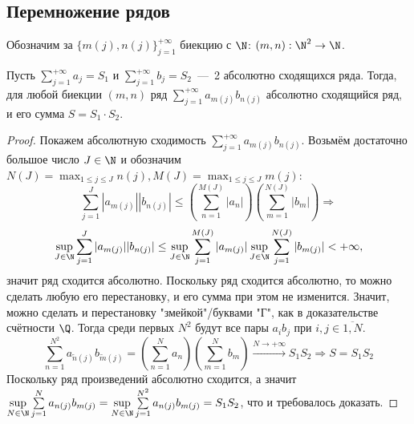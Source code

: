 \subsection{Перемножение рядов}
\begin{note}
    Обозначим за $\{m(j), n(j)\}_{j = 1}^{+\infty}$ биекцию с $\N$: $(m, n): \N^2 \rightarrow \N$.
\end{note}
\begin{theorem}
    Пусть $\sum\limits_{j = 1}^{+\infty} a_j = S_1$ и $\sum\limits_{j = 1}^{+\infty} b_j = S_2$~---~2 абсолютно сходящихся ряда. Тогда, для любой биекции $(m, n)$ ряд $\sum\limits_{j = 1}^{+\infty} a_{m(j)}b_{n(j)}$ абсолютно сходящийся ряд, и его сумма $S = S_1 \cdot S_2$.
\end{theorem}
\begin{proof}
    Покажем абсолютную сходимость $\sum\limits_{j = 1}^{+\infty} a_{m(j)}b_{n(j)}$. Возьмём достаточно большое число $J \in \N$ и обозначим $N(J) = \max_{1 \leq j \leq J} n(j), M(J) = \max_{1 \leq j \leq J} m(j)$:
    \[ \sum\limits_{j = 1}^J|a_{m(j)}||b_{n(j)}| \leq (\sum\limits_{n = 1}^{M(J)} |a_n|)(\sum\limits_{m = 1}^{N(J)} |b_m|) \Rightarrow\]
    \[ \sup\limits_{J \in \N} \sum\limits_{j = 1}^J |a_{m(j)}||b_{n(j)}| \leq \sup\limits_{J \in \N} \sum\limits_{j = 1}^{M(J)} |a_{m(j)}| \sup\limits_{J \in \N} \sum\limits_{j = 1}^{N(J)} |b_{m(j)}| < +\infty, \]
    значит ряд сходится абсолютно. Поскольку ряд сходится абсолютно, то можно сделать любую его перестановку, и его сумма при этом не изменится. Значит, можно сделать и перестановку "змейкой"/буквами "Г", как в доказательстве счётности $\Q$. Тогда среди первых $N^2$ будут все пары $a_ib_j$ при $i, j \in \overline{1, N}$.
    \[ \sum\limits_{n = 1}^{N^2} a_{\tilde{n}(j)}b_{\tilde{m}(j)} = (\sum\limits_{n = 1}^N a_n)(\sum\limits_{m = 1}^{N} b_m) \xrightarrow{N \rightarrow + \infty} S_1S_2 \Rightarrow S = S_1S_2\]
    Поскольку ряд произведений абсолютно сходится, а значит $\sup\limits_{N \in \N} \sum\limits_{j = 1}^N a_{n(j)}b_{m(j)} = \sup\limits_{N \in \N} \sum\limits_{j = 1}^{N^2} a_{n(j)}b_{m(j)} = S_1S_2$, что и требовалось доказать.
\end{proof}